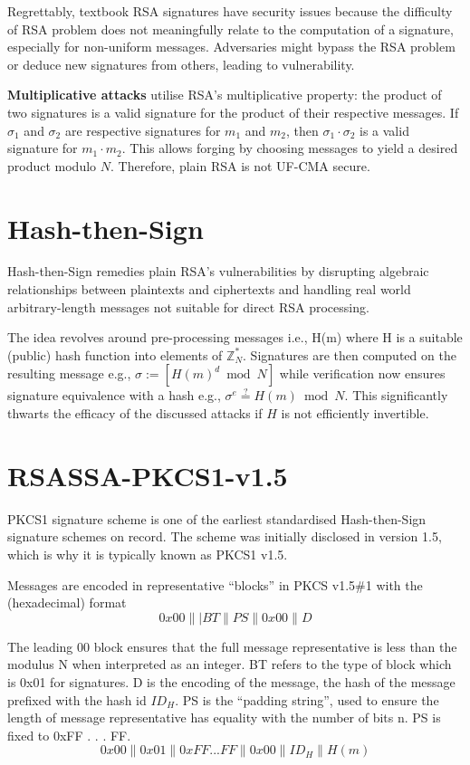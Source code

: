 \documentclass[]{final_report}
\theoremstyle{definition}
\begin{document}
Regrettably, textbook RSA signatures have security issues because the difficulty of RSA problem does not meaningfully relate to the computation of a signature, especially for non-uniform messages. Adversaries might bypass the RSA problem or deduce new signatures from others, leading to vulnerability.

\textbf{Multiplicative attacks} utilise RSA's multiplicative property: the product of two signatures is a valid signature for the product of their respective messages. If \( \sigma_{1} \) and \( \sigma_{2} \) are respective signatures for \( m_{1} \) and \( m_{2} \), then \( \sigma_{1} \cdot \sigma_{2} \) is a valid signature for \( m_{1} \cdot m_{2} \). This allows forging by choosing messages to yield a desired product modulo \( N \). Therefore, plain RSA is not UF-CMA secure.

\section{Hash-then-Sign}
\label{def:hashed rsa}
Hash-then-Sign remedies plain RSA's vulnerabilities by disrupting algebraic relationships between plaintexts and ciphertexts and handling real world arbitrary-length messages not suitable for direct RSA processing.

The idea revolves around pre-processing messages i.e., H(m) where H is a suitable (public) hash function into elements of \( \mathbb{Z}^*_{N} \). Signatures are then computed on the resulting message e.g., $\sigma := [H(m)^d \bmod N]$ while verification now ensures signature equivalence with a hash e.g.,  $\sigma^e \stackrel{?}{=} H(m) \bmod N$. This significantly thwarts the efficacy of the discussed attacks if \( H \) is not efficiently invertible.


\section{RSASSA-PKCS1-v1.5}
PKCS1 signature scheme is one of the earliest standardised Hash-then-Sign signature schemes on record. The scheme was initially disclosed in version 1.5, which is why it is typically known as PKCS1 v1.5.

Messages are encoded in representative “blocks” in PKCS v1.5\#1 with the (hexadecimal) format
\[0x00\||BT\|PS\|0x00\|D\]

The leading 00 block ensures that the full message representative is less than the modulus N when interpreted as an integer. BT refers to the type of block which is 0x01 for signatures. D is the encoding of the message, the hash of the message prefixed with the hash id $ID_{H}$. PS is the “padding string”, used to ensure the length of message representative has equality with the number of bits n. PS is fixed to 0xFF . . . FF.
\[0x00\|0x01\|0xFF . . . FF\|0x00\|ID_{H}\|H(m)\]
\end{document}
